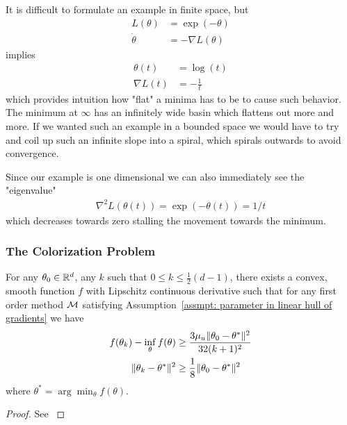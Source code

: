 It is difficult to formulate an example in finite space, but
%
\begin{align*}
	L(\theta) &= \exp(-\theta) \\
	\dot{\theta} &= -\nabla L(\theta)
\end{align*}
%
implies
%
\begin{align*}
	\theta(t) &= \log(t)\\
	\nabla L(t) &= -\tfrac1t
\end{align*}
%
which provides intuition how "flat" a minima has to be to cause such behavior.
The minimum at \(\infty\) has an infinitely wide basin which flattens out
more and more. If we wanted such an example in a bounded space we would have
to try and coil up such an infinite slope into a spiral, which spirals outwards
to avoid convergence.

Since our example is one dimensional we can also immediately see the "eigenvalue"
%
\begin{align*}
	\nabla^2 L(\theta(t)) = \exp(-\theta(t)) = 1/t
\end{align*}
%
which decreases towards zero stalling the movement towards the minimum.

\subsubsection{The Colorization Problem}

\begin{assumption}\label{assmpt: parameter in linear hull of gradients}

\end{assumption}

\begin{theorem}
	For any \(\theta_0\in\mathbb{R}^d\), any \(k\) such that \(0\le k\le \tfrac12 (d-1)\),
	there exists a convex, smooth function \(f\) with Lipschitz continuous
	derivative such that for any first order method \(\mathcal{M}\)
	satisfying Assumption~\ref{assmpt: parameter in linear hull of gradients}
	we have
	\begin{subequations}
	\begin{align}
		f(\theta_k) - \inf_\theta f(\theta)
		&\ge \frac{3\mu_u \|\theta_0 - \theta^*\|^2}{32(k+1)^2} \\
		\|\theta_k -\theta^*\|^2 
		&\ge \frac18 \|\theta_0 - \theta^*\|^2
	\end{align}
	\end{subequations}
	where \(\theta^* = \arg\min_\theta f(\theta)\).
\end{theorem}
\begin{proof}
	See \textcite[Theorem 2.1.7]{nesterovLecturesConvexOptimization2018}
\end{proof}

